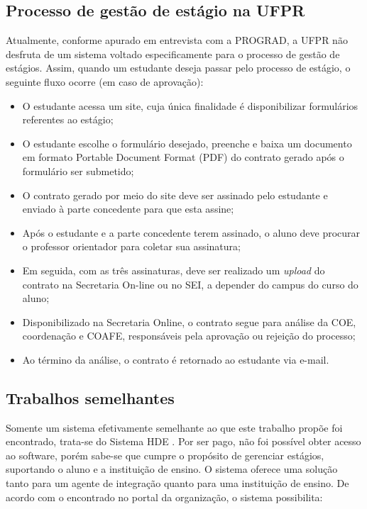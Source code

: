 \documentclass[conference,a4paper,10pt]{IEEETran}
\begin{document}
\subsection{Processo de gestão de estágio na UFPR}

Atualmente, conforme apurado em entrevista com a PROGRAD, a UFPR não desfruta de um sistema voltado especificamente para o processo de gestão de estágios. Assim, quando um estudante deseja passar pelo processo de estágio, o seguinte fluxo ocorre (em caso de aprovação):

\begin{itemize}
    \item O estudante acessa um site, cuja única finalidade é disponibilizar formulários referentes ao estágio;
    \item O estudante escolhe o formulário desejado, preenche e baixa um documento em formato Portable Document Format (PDF) do contrato
gerado após o formulário ser submetido;
    \item O contrato gerado por meio do site deve ser assinado pelo estudante e enviado à parte concedente para que esta assine;
    \item Após o estudante e a parte concedente terem assinado, o aluno deve procurar o professor orientador para coletar sua assinatura;
    \item Em seguida, com as três assinaturas, deve ser realizado um \textit{upload} do contrato na Secretaria On-line ou no SEI, a depender do campus do curso do aluno;
    \item Disponibilizado na Secretaria Online, o contrato segue para análise da COE, coordenação e COAFE, responsáveis pela aprovação ou rejeição do processo;
    \item Ao término da análise, o contrato é retornado ao estudante via e-mail.
\end{itemize}

\subsection{Trabalhos semelhantes}\label{sec:trabsem}

Somente um sistema efetivamente semelhante ao que este trabalho propõe foi encontrado, trata-se do Sistema HDE \cite{sistemahde}. Por ser pago, não foi possível obter acesso ao software, porém sabe-se que cumpre o propósito de gerenciar estágios, suportando o aluno e a instituição de ensino. O sistema oferece uma solução tanto para um agente de integração quanto para uma instituição de ensino. De acordo com o encontrado no portal da organização, o sistema possibilita:
\end{document}
